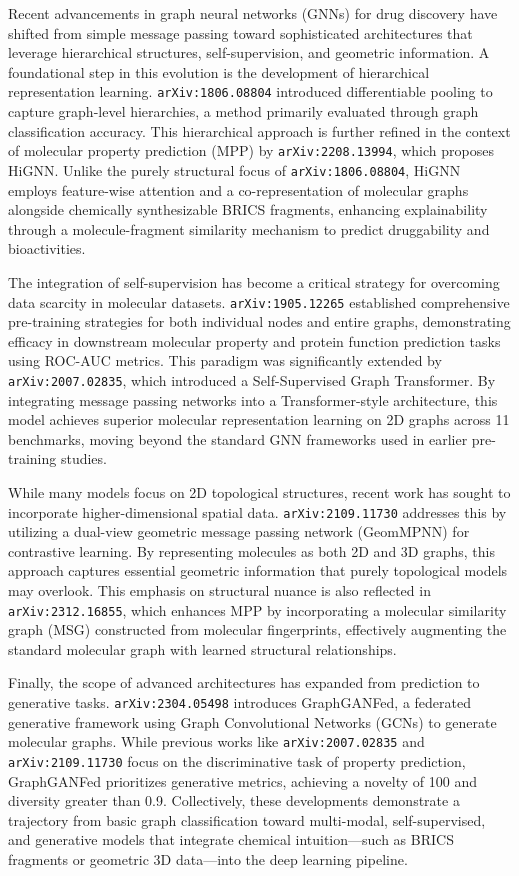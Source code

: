 \documentclass[11pt]{article}
\begin{document}
Recent advancements in graph neural networks (GNNs) for drug discovery have shifted from simple message passing toward sophisticated architectures that leverage hierarchical structures, self-supervision, and geometric information. A foundational step in this evolution is the development of hierarchical representation learning. \texttt{arXiv:1806.08804} introduced differentiable pooling to capture graph-level hierarchies, a method primarily evaluated through graph classification accuracy. This hierarchical approach is further refined in the context of molecular property prediction (MPP) by \texttt{arXiv:2208.13994}, which proposes HiGNN. Unlike the purely structural focus of \texttt{arXiv:1806.08804}, HiGNN employs feature-wise attention and a co-representation of molecular graphs alongside chemically synthesizable BRICS fragments, enhancing explainability through a molecule-fragment similarity mechanism to predict druggability and bioactivities.

The integration of self-supervision has become a critical strategy for overcoming data scarcity in molecular datasets. \texttt{arXiv:1905.12265} established comprehensive pre-training strategies for both individual nodes and entire graphs, demonstrating efficacy in downstream molecular property and protein function prediction tasks using ROC-AUC metrics. This paradigm was significantly extended by \texttt{arXiv:2007.02835}, which introduced a Self-Supervised Graph Transformer. By integrating message passing networks into a Transformer-style architecture, this model achieves superior molecular representation learning on 2D graphs across 11 benchmarks, moving beyond the standard GNN frameworks used in earlier pre-training studies.

While many models focus on 2D topological structures, recent work has sought to incorporate higher-dimensional spatial data. \texttt{arXiv:2109.11730} addresses this by utilizing a dual-view geometric message passing network (GeomMPNN) for contrastive learning. By representing molecules as both 2D and 3D graphs, this approach captures essential geometric information that purely topological models may overlook. This emphasis on structural nuance is also reflected in \texttt{arXiv:2312.16855}, which enhances MPP by incorporating a molecular similarity graph (MSG) constructed from molecular fingerprints, effectively augmenting the standard molecular graph with learned structural relationships.

Finally, the scope of advanced architectures has expanded from prediction to generative tasks. \texttt{arXiv:2304.05498} introduces GraphGANFed, a federated generative framework using Graph Convolutional Networks (GCNs) to generate molecular graphs. While previous works like \texttt{arXiv:2007.02835} and \texttt{arXiv:2109.11730} focus on the discriminative task of property prediction, GraphGANFed prioritizes generative metrics, achieving a novelty of 100 and diversity greater than 0.9. Collectively, these developments demonstrate a trajectory from basic graph classification toward multi-modal, self-supervised, and generative models that integrate chemical intuition—such as BRICS fragments or geometric 3D data—into the deep learning pipeline.
\end{document}
